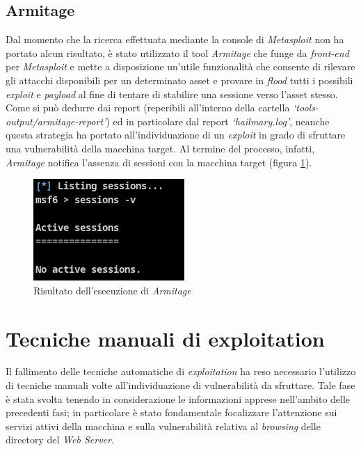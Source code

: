 \subsection{Armitage}
Dal momento che la ricerca effettuata mediante la console di \emph{Metasploit} non ha portato alcun risultato, è stato utilizzato il tool \emph{Armitage} che funge da \emph{front-end} per \emph{Metasploit} e mette a disposizione un'utile funzionalità che consente di rilevare gli attacchi disponibili per un determinato asset e provare in \emph{flood} tutti i possibili \emph{exploit} e \emph{payload} al fine di tentare di stabilire una sessione verso l'asset stesso. Come si può dedurre dai report (reperibili all'interno della cartella \emph{`tools-output/armitage-report'}) ed in particolare dal report \emph{`hailmary.log'}, neanche questa strategia ha portato all'individuazione di un \emph{exploit} in grado di sfruttare una vulnerabilità della macchina target. Al termine del processo, infatti, \emph{Armitage} notifica l'assenza di sessioni con la macchina target (figura \ref{fig:armitage}).
\begin{figure}[h]
    \centering
    \includegraphics[scale=1]{capitoli/images/armitage.png}
    \caption{Risultato dell'esecuzione di \emph{Armitage}}
    \label{fig:armitage}
\end{figure}
\section{Tecniche manuali di exploitation}
Il fallimento delle tecniche automatiche di \emph{exploitation} ha reso necessario l'utilizzo di tecniche manuali volte all'individuazione di vulnerabilità da sfruttare. Tale fase è stata svolta tenendo in considerazione le informazioni apprese nell'ambito delle precedenti fasi; in particolare è stato fondamentale focalizzare l'attenzione sui servizi attivi della macchina e sulla vulnerabilità relativa al \emph{browsing} delle directory del \emph{Web Server}. 

